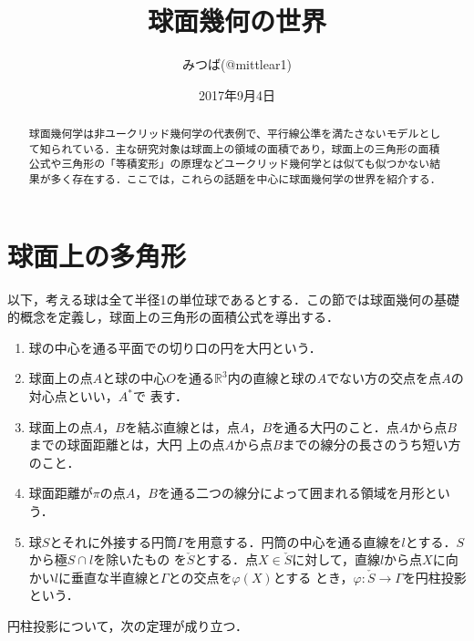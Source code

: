 \documentclass[uplatex]{jsarticle}
\begin{document}
\title{球面幾何の世界}
\author{みつば(@mittlear1)}
\date{2017年9月4日}
\maketitle
\begin{abstract}
球面幾何学は非ユークリッド幾何学の代表例で、平行線公準を満たさないモデルとして知られている．主な研究対象は球面上の領域の面積であり，球面上の三角形の面積公式や三角形の「等積変形」の原理などユークリッド幾何学とは似ても似つかない結果が多く存在する．ここでは，これらの話題を中心に球面幾何学の世界を紹介する．
\end{abstract}



\section{球面上の多角形}
以下，考える球は全て半径1の単位球であるとする．この節では球面幾何の基礎的概念を定義し，球面上の三角形の面積公式を導出する．

\begin{definition} 
\begin{enumerate}[label=(\arabic*)]
\item 球の中心を通る平面での切り口の円を大円という．
\item 球面上の点$A$と球の中心$O$を通る$\mathbb{R}^3$内の直線と球の$A$でない方の交点を点$A$の対心点といい，$A^*$で
表す．
\item 球面上の点$A$，$B$を結ぶ直線とは，点$A$，$B$を通る大円のこと．点$A$から点$B$までの球面距離とは，大円
上の点$A$から点$B$までの線分の長さのうち短い方のこと．
\item 球面距離が$\pi$の点$A$，$B$を通る二つの線分によって囲まれる領域を月形という．
\item 球$S$とそれに外接する円筒$\Gamma$を用意する．円筒の中心を通る直線を$l$とする．$S$から極$S\cap l$を除いたもの
を$\check{S}$とする．点$X\in\check{S}$に対して，直線$l$から点$X$に向かい$l$に垂直な半直線と$\Gamma$との交点を$\varphi(X)$とする
とき，$\varphi:\check{S}→\Gamma$を円柱投影という．
\end{enumerate}
\end{definition}

円柱投影について，次の定理が成り立つ．
\end{document}

